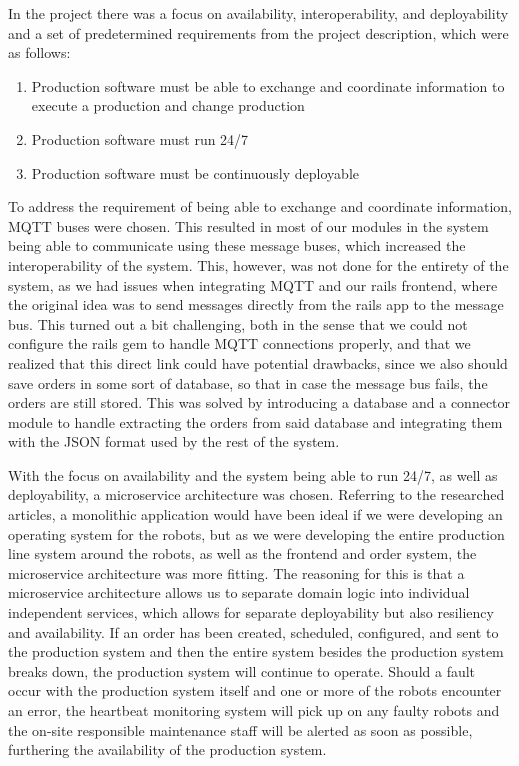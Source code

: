 
In the project there was a focus on availability, interoperability, and deployability and a set of predetermined requirements from the project description, which were as follows:
\begin{enumerate}
    \item Production software must be able to exchange and coordinate information to execute a production and change production
    \item Production software must run 24/7
    \item Production software must be continuously deployable
\end{enumerate}
To address the requirement of being able to exchange and coordinate information, MQTT buses were chosen. This resulted in most of our modules in the system being able to communicate using these message buses, which increased the interoperability of the system. This, however, was not done for the entirety of the system, as we had issues when integrating MQTT and our rails frontend, where the original idea was to send messages directly from the rails app to the message bus. This turned out a bit challenging, both in the sense that we could not configure the rails gem to handle MQTT connections properly, and that we realized that this direct link could have potential drawbacks, since we also should save orders in some sort of database, so that in case the message bus fails, the orders are still stored. This was solved by introducing a database and a connector module to handle extracting the orders from said database and integrating them with the JSON format used by the rest of the system.

With the focus on availability and the system being able to run 24/7, as well as deployability, a microservice architecture was chosen. Referring to the researched articles, a monolithic application would have been ideal if we were developing an operating system for the robots\cite{9659378}, but as we were developing the entire production line system around the robots, as well as the frontend and order system, the microservice architecture was more fitting\cite{8387665}. The reasoning for this is that a microservice architecture allows us to separate domain logic into individual independent services, which allows for separate deployability but also resiliency and availability. If an order has been created, scheduled, configured, and sent to the production system and then the entire system besides the production system breaks down, the production system will continue to operate.
Should a fault occur with the production system itself and one or more of the robots encounter an error, the heartbeat monitoring system will pick up on any faulty robots and the on-site responsible maintenance staff will be alerted as soon as possible, furthering the availability of the production system.

